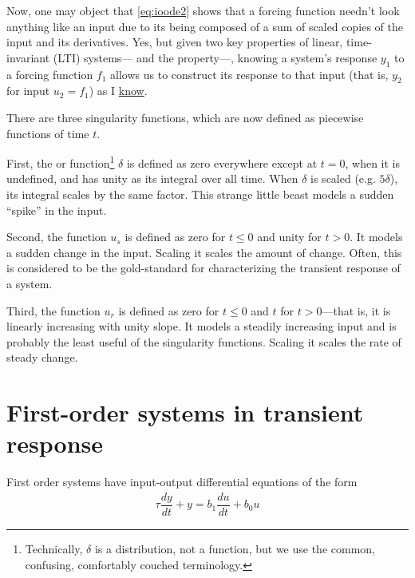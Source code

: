 \documentclass[dynamic_systems.tex]{subfiles}
\begin{document}
Now, one may object that \autoref{eq:ioode2} shows that a forcing function needn't look anything like an input due to its being composed of a sum of scaled copies of the input and its derivatives.
Yes, but given two key properties of linear, time-invariant (LTI) systems--- and the  property---, knowing a system's response $y_1$ to a forcing function $f_1$ allows us to construct its response to that input (that is, $y_2$ for input $u_2 = f_1$) as
\tags{}
\noindent I \href{http://ricopic.one/resources/mind_blown.gif}{know}.

There are three singularity functions, which are now defined as piecewise functions of time $t$.
\tags{}

First, the  or  function\footnote{Technically, $\delta$ is a distribution, not a function, but we use the common, confusing, comfortably couched terminology.} $\delta$ is defined as zero everywhere except at $t=0$, when it is undefined, and has unity as its integral over all time.
When $\delta$ is scaled (e.g. $5\delta$), its integral scales by the same factor.
This strange little beast models a sudden ``spike'' in the input.
\tags{}

Second, the  function $u_s$ is defined as zero for $t \le 0$ and unity for $t>0$.
It models a sudden change in the input.
Scaling it scales the amount of change.
Often, this is considered to be the gold-standard for characterizing the transient response of a system.%
\tags{}

Third, the  function $u_r$ is defined as zero for $t \le 0$ and $t$ for $t>0$---that is, it is linearly increasing with unity slope.
It models a steadily increasing input and is probably the least useful of the singularity functions.
Scaling it scales the rate of steady change.
\tags{}

\section[First-order systems]{First-order systems in transient response}
\tags{}

First order systems have input-output differential equations of the form
\begin{align}
	\label{eq:io_ode_first_order}
	\tau \dfrac{d y}{d t} + y = b_1 \dfrac{d u}{d t} + b_0 u
\end{align}
\end{document}
